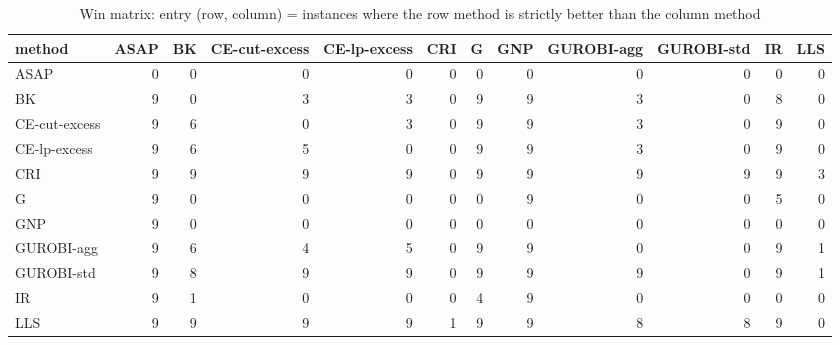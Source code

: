 \begin{table}[htbp]
\centering
\small
\caption{Win matrix: entry (row, column) = instances where the row method is strictly better than the column method}
\label{tab:E6_scalability_b120_wins}
\begin{tabular}{lrrrrrrrrrrr}
\toprule
method & ASAP & BK & CE-cut-excess & CE-lp-excess & CRI & G & GNP & GUROBI-agg & GUROBI-std & IR & LLS \\
\midrule
ASAP & 0 & 0 & 0 & 0 & 0 & 0 & 0 & 0 & 0 & 0 & 0 \\
BK & 9 & 0 & 3 & 3 & 0 & 9 & 9 & 3 & 0 & 8 & 0 \\
CE-cut-excess & 9 & 6 & 0 & 3 & 0 & 9 & 9 & 3 & 0 & 9 & 0 \\
CE-lp-excess & 9 & 6 & 5 & 0 & 0 & 9 & 9 & 3 & 0 & 9 & 0 \\
CRI & 9 & 9 & 9 & 9 & 0 & 9 & 9 & 9 & 9 & 9 & 3 \\
G & 9 & 0 & 0 & 0 & 0 & 0 & 9 & 0 & 0 & 5 & 0 \\
GNP & 9 & 0 & 0 & 0 & 0 & 0 & 0 & 0 & 0 & 0 & 0 \\
GUROBI-agg & 9 & 6 & 4 & 5 & 0 & 9 & 9 & 0 & 0 & 9 & 1 \\
GUROBI-std & 9 & 8 & 9 & 9 & 0 & 9 & 9 & 9 & 0 & 9 & 1 \\
IR & 9 & 1 & 0 & 0 & 0 & 4 & 9 & 0 & 0 & 0 & 0 \\
LLS & 9 & 9 & 9 & 9 & 1 & 9 & 9 & 8 & 8 & 9 & 0 \\
\bottomrule
\end{tabular}
\end{table}

